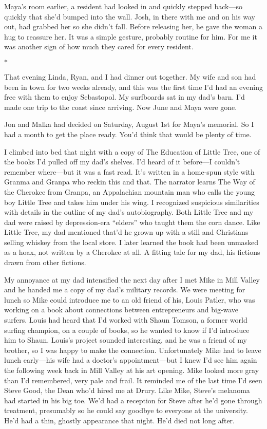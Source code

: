 \documentclass[12pt]{book}
\begin{document}
Maya's room earlier, a resident had looked in and quickly stepped back---so quickly that she'd bumped into the wall. Josh, in there with me and on his way out, had grabbed her so she didn't fall. Before releasing her, he gave the woman a hug to reassure her. It was a simple gesture, probably routine for him. For me it was another sign of how much they cared for every resident.

\begin{center}$*$\end{center}

That evening Linda, Ryan, and I had dinner out together. My wife and son had been in town for two weeks already, and this was the first time I'd had an evening free with them to enjoy Sebastopol. My surfboards sat in my dad's barn. I'd made one trip to the coast since arriving. Now June and Maya were gone.

Jon and Malka had decided on Saturday, August 1st for Maya's memorial. So I had a month to get the place ready. You'd think that would be plenty of time.

I climbed into bed that night with a copy of The Education of Little Tree, one of the books I'd pulled off my dad's shelves. I'd heard of it before---I couldn't remember where---but it was a fast read. It's written in a home-spun style with Granma and Granpa who reckin this and that. The narrator learns The Way of the Cherokee from Granpa, an Appalachian mountain man who calls the young boy Little Tree and takes him under his wing. I recognized suspicious similarities with details in the outline of my dad's autobiography. Both Little Tree and my dad were raised by depression-era ``elders'' who taught them the corn dance. Like Little Tree, my dad mentioned that'd he grown up with a still and Christians selling whiskey from the local store. I later learned the book had been unmasked as a hoax, not written by a Cherokee at all. A fitting tale for my dad, his fictions drawn from other fictions.

My annoyance at my dad intensified the next day after I met Mike in Mill Valley and he handed me a copy of my dad's military records. We were meeting for lunch so Mike could introduce me to an old friend of his, Louis Patler, who was working on a book about connections between entrepreneurs and big-wave surfers. Louis had heard that I'd worked with Shaun Tomson, a former world surfing champion, on a couple of books, so he wanted to know if I'd introduce him to Shaun. Louis's project sounded interesting, and he was a friend of my brother, so I was happy to make the connection. Unfortunately Mike had to leave lunch early---his wife had a doctor's appointment---but I knew I'd see him again the following week back in Mill Valley at his art opening. Mike looked more gray than I'd remembered, very pale and frail. It reminded me of the last time I'd seen Steve Good, the Dean who'd hired me at Drury. Like Mike, Steve's melanoma had started in his big toe. We'd had a reception for Steve after he'd gone through treatment, presumably so he could say goodbye to everyone at the university. He'd had a thin, ghostly appearance that night. He'd died not long after.
\end{document}
